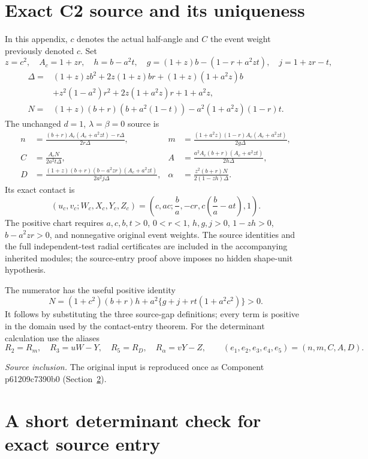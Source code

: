 \section{\texorpdfstring{Exact C2 source and its uniqueness}{Exact C2 source and its uniqueness}}
\label{component:p6e5d41ed80b3}
\label{p6e5d41ed80b3:app:c2-source}
In this appendix, $c$ denotes the actual half-angle and
$C$ the event weight previously denoted $c$. Set
\[
 z=c^2,\quad A_c=1+zr,\quad
 h=b-a^2t,\quad g=(1+z)b-(1-r+a^2zt),\quad j=1+zr-t,
\]
\begin{align*}
\Delta={}&(1+z)zb^2+2z(1+z)br+(1+z)(1+a^2z)b\\
 &+z^2(1-a^2)r^2+2z(1+a^2z)r+1+a^2z,\\
N={}&(1+z)(b+r)(b+a^2(1-t))-a^2(1+a^2z)(1-r)t.
\end{align*}
The unchanged $d=1$, $\lambda=\beta=0$ source is
\begin{align*}
n&=\frac{(b+r)A_c(A_c+a^2zt)-r\Delta}{2r\Delta},&
m&=\frac{(1+a^2z)(1-r)A_c(A_c+a^2zt)}{2g\Delta},\\
C&=\frac{A_cN}{2a^2t\Delta},&
A&=\frac{a^2A_c(b+r)(A_c+a^2zt)}{2h\Delta},\\
D&=\frac{(1+z)(b+r)(b-a^2zr)(A_c+a^2zt)}{2a^2j\Delta},&
\alpha&=\frac{z^2(b+r)N}{2(1-zh)\Delta}.
\end{align*}
Its exact contact is
\[
 (u_c,v_c;W_c,X_c,Y_c,Z_c)
   =\left(c,ac;\frac ba,-cr,c\left(\frac ba-at\right),1\right).
\]
The positive chart requires $a,c,b,t>0$, $0<r<1$, $h,g,j>0$,
$1-zh>0$, $b-a^2zr>0$, and nonnegative original event weights.
The source identities and the full independent-test radial certificates
are included in the accompanying inherited modules; the source-entry
proof above imposes no hidden shape-unit hypothesis.


The numerator has the useful positive identity
\[
N=(1+c^2)(b+r)h+a^2\{g+j+rt(1+a^2c^2)\}>0.
\]
It follows by substituting the three source-gap definitions; every term
is positive in the domain used by the contact-entry theorem.
For the determinant calculation use the aliases
\[
 R_2=R_m,\quad R_3=uW-Y,\quad R_5=R_D,\quad R_\alpha=vY-Z,
 \qquad(e_1,e_2,e_3,e_4,e_5)=(n,m,C,A,D).
\]
\par\noindent\textit{Source inclusion. }The original input is reproduced once as Component p61209c7390b0 (Section~\ref{component:p61209c7390b0}).\par


\section{\texorpdfstring{A short determinant check for exact source entry}{A short determinant check for exact source entry}}
\label{component:p61209c7390b0}

